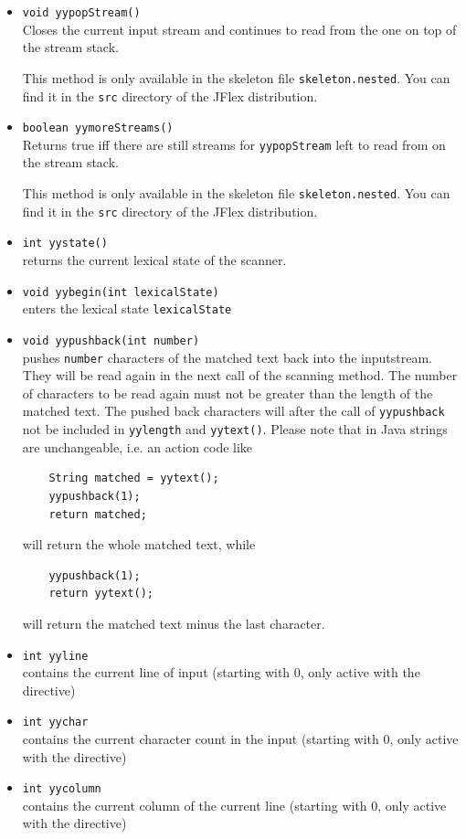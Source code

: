 \documentclass[11pt]{scrartcl}
\begin{document}
\begin{itemize}
\item \texttt{void yypopStream()}\\
  Closes the current input stream and continues to
  read from the one on top of the stream stack.

  This method is only available in the skeleton file
  \texttt{skeleton.nested}. You can find it in the 
  \texttt{src} directory of the JFlex distribution.

\item \texttt{boolean yymoreStreams()}\\
  Returns true iff there are still streams for \texttt{yypopStream} 
  left to read from on the stream stack.

  This method is only available in the skeleton file
  \texttt{skeleton.nested}. You can find it in the 
  \texttt{src} directory of the JFlex distribution. 

\item \texttt{int yystate()}\\
  returns the current lexical state of the scanner.

\item \texttt{void yybegin(int lexicalState)}\\
  enters the lexical state \texttt{lexicalState}

\item \texttt{void yypushback(int number)}\\
  pushes \texttt{number} characters of the matched text back into the inputstream. 
  They will be read again in the next call of the scanning method. 
  The number of characters to be read again must not be greater than the length
  of the matched text. The pushed back characters will after the call of 
  \texttt{yypushback} not be included in \texttt{yylength} and \texttt{yytext()}.
  Please note that in Java strings are unchangeable, i.e. an action code like
  \begin{verbatim}
    String matched = yytext();
    yypushback(1);
    return matched;
  \end{verbatim}
  will return the whole matched text, while    
  \begin{verbatim}
    yypushback(1);
    return yytext();
  \end{verbatim}
  will return the matched text minus the last character.

\item\texttt{int yyline}\\
  contains the current line of input (starting with 0, only active with
  the \texttt{} directive)

\item \texttt{int yychar}\\
  contains the current character count in the input (starting with 0,
  only active with the \texttt{} directive)

\item \texttt{int yycolumn}\\
  contains the current column of the current line (starting with 0, only
  active with the \texttt{} directive)

\end{itemize}
\end{document}
